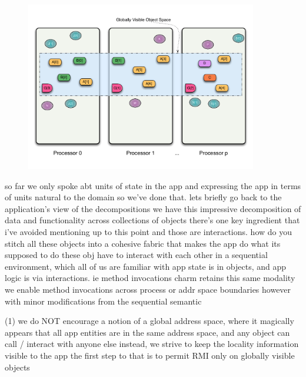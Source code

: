 \begin{frame}
  \frametitle{
  }
  \begin{figure}\includegraphics[width=0.9\textwidth]{../figures/progmodel/07-obj-programmer-view.pdf}\end{figure}
\end{frame}


\begin{frame}
so far we only spoke abt units of state in the app
and expressing the app in terms of units natural to the domain
so we've done that.
lets briefly go back to the application's view of the decompositions
we have this impressive decomposition of data and functionality across collections of objects
there's one key ingredient that i've avoided mentioning up to this point
and those are interactions.
how do you stitch all these objects into a cohesive fabric that makes the app do what its supposed
to do
these obj have to interact with each other
in a sequential environment, which all of us are familiar with
app state is in objects, and app logic is via interactions. ie method invocations
charm retains this same modality
we enable method invocations across process or addr space boundaries
however with minor modifications from the sequential semantic
\end{frame}


\begin{frame}
(1) we do NOT encourage a notion of a global address space, where it magically appears that
all app entities are in the same address space, and any object can call / interact with anyone else
instead, we strive to keep the locality information visible to the app
the first step to that is to permit RMI only on globally visible objects
\end{frame}


